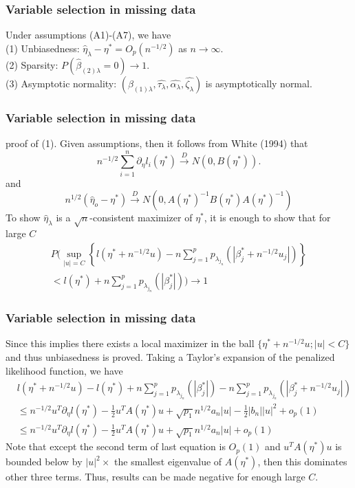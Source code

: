 \documentclass{beamer}
\begin{document}
\begin{frame}
\frametitle{Variable selection in missing data}
\begin{theorem} Under assumptions (A1)-(A7), we have\\
(1) Unbiasedness: $\hat{\eta}_\lambda - \eta^* = O_p (n^{-1/2})$ as $n \to \infty$.\\
(2) Sparsity: $P( \hat{\beta}_{(2) \lambda} = 0 ) \to 1$. \\ 
(3) Asymptotic normality: $(\hat{\beta}_{(1)\lambda}, \hat{\tau_{\lambda}}, \hat{\alpha_{\lambda}},\hat{\zeta_{\lambda}} ) $ is asymptotically normal.
\end{theorem}
\end{frame}
\begin{frame}
\frametitle{Variable selection in missing data}

proof of (1). Given assumptions, then it follows from White (1994) that
$$
n^{-1/2} \sum_{i=1} ^{n} \partial _\eta  l_i(\eta^*) \overset{D}\to N(0, B(\eta^*)).
$$
and
$$
n^{1/2}(\hat{\eta}_o - \eta^*) \overset{D}\to N(0, A(\eta^*) ^{-1} B(\eta^*)A(\eta^*) ^{-1} )
$$
To show $\hat{\eta}_\lambda$ is a $\sqrt{n}$-consistent maximizer of $\eta^*$, it is enough to show that for large $C$
\begin{align*}
P  \Big( \sup_{|u| =C} \left\{  l(\eta^* + n^{-1/2} u ) - n \sum_{j=1} ^p p_{\lambda_{j_n}} (|\beta_j ^* + n^{-1/2} u_j |)  \right\}\\ <  l(\eta^*) +n \sum_{j=1} ^p p_{\lambda_{j_n}} (|\beta_j ^* |)  \Big) \to 1
\end{align*}

\end{frame}
\begin{frame}
\frametitle{Variable selection in missing data}

Since this implies there exists a local maximizer in the ball $\{ \eta^* + n^{-1/2} u; |u| <C  \}$ and thus unbiasedness is proved. Taking a Taylor\rq{}s expansion of the penalized likelihood function, we have
\begin{align*}
& l(\eta^* + n^{-1/2} u )  -  l(\eta^*) +n \sum_{j=1} ^p p_{\lambda_{j_n}} (|\beta_j ^* |) - n \sum_{j=1} ^p p_{\lambda_{j_n}} (|\beta_j ^* + n^{-1/2} u_j |) \\
&\leq n^{-1/2} u^T \partial_{\eta} l(\eta^*) - \frac{1}{2} u^T A(\eta^*) u +\sqrt{p_1}n^{1/2}a_n |u|-\frac{1}{2}|b_n| |u|^2 +o_p(1) \\
&\leq n^{-1/2} u^T \partial_{\eta} l(\eta^*) - \frac{1}{2} u^T A(\eta^*) u +\sqrt{p_1}n^{1/2}a_n |u| +o_p(1)
\end{align*}
Note that except the second term of last equation is $O_p(1)$ and $  u^T A(\eta^*) u$ is bounded below by $|u| ^2 \times $ the smallest eigenvalue of $ A(\eta^*)  $, then this dominates other three terms. Thus, results can be made negative for enough large $C$.

\end{frame}
\end{document}
